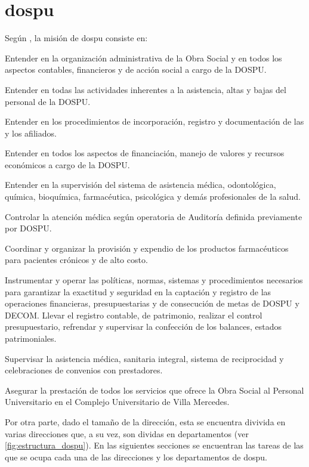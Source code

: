 \chapter{\acrfull{dospu}}

Según \cite{CSOrd17}, la misión de \acrshort{dospu} consiste en:

\begin{displayquote}
Entender en la organización administrativa de la Obra Social y en todos los aspectos contables, financieros y de acción social a cargo de la DOSPU.

Entender en todas las actividades inherentes a la asistencia, altas y bajas del personal de la DOSPU.

Entender en los procedimientos de incorporación, registro y documentación de las y los afiliados.

Entender en todos los aspectos de financiación, manejo de valores y recursos económicos a cargo de la DOSPU.

Entender en la supervisión del sistema de asistencia médica, odontológica, química, bioquímica, farmacéutica, psicológica y demás profesionales de la salud.

Controlar la atención médica según operatoria de Auditoría definida previamente por DOSPU.

Coordinar y organizar la provisión y expendio de los productos farmacéuticos para pacientes crónicos y de alto costo.

Instrumentar y operar las políticas, normas, sistemas y procedimientos necesarios para garantizar la exactitud y seguridad en la captación y registro de las operaciones financieras, presupuestarias y de consecución de metas de DOSPU y DECOM. Llevar el registro contable, de patrimonio, realizar el control presupuestario, refrendar y supervisar la confección de los balances, estados patrimoniales.

Supervisar la asistencia médica, sanitaria integral, sistema de reciprocidad y celebraciones de convenios con prestadores.

Asegurar la prestación de todos los servicios que ofrece la Obra Social al Personal Universitario en el Complejo Universitario de Villa Mercedes.
\hfill\parencite{CSOrd17}
\end{displayquote}

Por otra parte, dado el tamaño de la dirección, esta se encuentra divivida en varias direcciones que, a su vez, son dividas en departamentos (ver \cref{fig:estructura_dospu}). En las siguientes secciones se encuentran las tareas de las que se ocupa cada una de las direcciones y los departamentos de \acrshort{dospu}.

